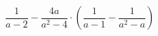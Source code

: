 \begin{ex}[type=expression]
	\begin{condition}
		\(\dfrac{1}{a-2}-\dfrac{4a}{a^2-4}\cdot\left( \dfrac{1}{a-1}-\dfrac{1}{a^2-a} \right)\)
	\end{condition}
\end{ex}